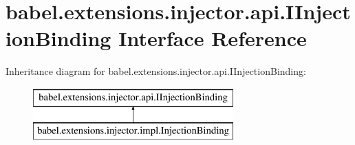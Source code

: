 \hypertarget{interfacebabel_1_1extensions_1_1injector_1_1api_1_1_i_injection_binding}{\section{babel.\-extensions.\-injector.\-api.\-I\-Injection\-Binding Interface Reference}
\label{interfacebabel_1_1extensions_1_1injector_1_1api_1_1_i_injection_binding}
}
Inheritance diagram for babel.\-extensions.\-injector.\-api.\-I\-Injection\-Binding\-:\begin{figure}[H]
\begin{center}
\leavevmode
\includegraphics[height=2.000000cm]{interfacebabel_1_1extensions_1_1injector_1_1api_1_1_i_injection_binding}
\end{center}
\end{figure}
